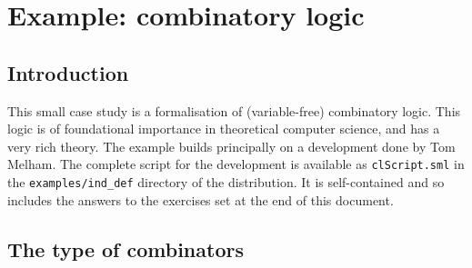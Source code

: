 \newcommand{\eos}{\hfill{}$\cdots\diamond\cdots$\hfill{}\vspace{5mm}}

\newcommand{\mathpredn}{\mathbin{-\!\!\!\mid\mid\!\rightarrow}}

\newcommand{\KC}{\con{K}}
\newcommand{\SC}{\con{S}}
\newcommand{\bk}{\char'134}


\chapter{Example: combinatory logic}
\label{chap:combin}

\section{Introduction}
\label{sec:Introduction}

This small case study is a formalisation of (variable-free)
combinatory logic.  This logic is of foundational importance in
theoretical computer science, and has a very rich theory.  The example
builds principally on a development done by Tom Melham.  The complete
script for the development is available as \texttt{clScript.sml} in
the \texttt{examples/ind\_def} directory of the distribution.  It is
self-contained and so includes the answers to the exercises set at the
end of this document.


\section{The type of combinators}
\label{sec:Type-Combinators}

